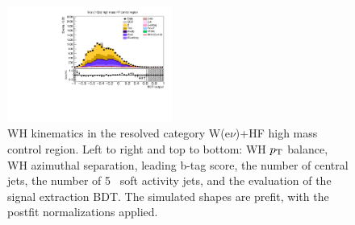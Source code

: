 \begin{figure}[tbp]
\begin{center}
    \includegraphics[width=0.48\textwidth]{figures/wlnhbb2016/resolved/WenWHHeavyFlavorCRHighMass_bdtValue.pdf}
    \caption{WH kinematics in the resolved category W(e$\nu$)+HF high mass control region.
    Left to right and top to bottom: WH $p_{\mathrm{T}}$ balance, WH azimuthal separation, leading b-tag score, the number of central jets,
    the number of 5 \GeV\ soft activity jets, and the evaluation of the signal extraction BDT.
    The simulated shapes are prefit, with the postfit normalizations applied.}
    \label{fig:res_WenHFHighMass_WH}
  \end{center}
\end{figure}
\clearpage


